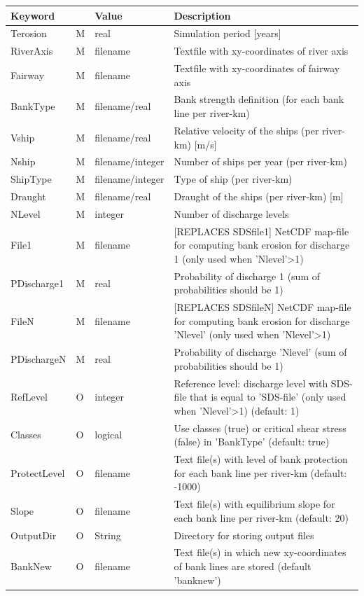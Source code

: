\begin{tabular}{lllp{5cm}}
Keyword &  & Value & Description \\ \hline
Terosion & M & real & Simulation period  [years] \\
RiverAxis & M & filename & Textfile with xy-coordinates of river axis \\
Fairway  & M & filename & Textfile with xy-coordinates of fairway axis \\
BankType & M & filename/real & Bank strength definition (for each bank line per river-km) \\
Vship  & M & filename/real & Relative velocity of the ships (per river-km) [m/s] \\
Nship  & M & filename/integer & Number of ships per year (per river-km) \\
ShipType & M & filename/integer & Type of ship (per river-km) \\
Draught & M & filename/real & Draught of the ships (per river-km) [m] \\
NLevel & M & integer & Number of discharge levels \\
File1 & M & filename & [REPLACES SDSfile1] NetCDF map-file for computing bank erosion for discharge 1 (only used when 'Nlevel'>1) \\
PDischarge1 & M & real & Probability of discharge 1 (sum of probabilities should be 1) \\
FileN & M & filename & [REPLACES SDSfileN] NetCDF map-file for computing bank erosion for discharge 'Nlevel' (only used when 'Nlevel'>1) \\
PDischargeN & M & real & Probability of discharge 'Nlevel' (sum of probabilities should be 1) \\
RefLevel & O & integer & Reference level: discharge level with SDS-file that is equal to 'SDS-file' (only used when 'Nlevel'>1)  (default: 1) \\
Classes & O & logical & Use classes (true) or critical shear stress (false) in 'BankType' (default: true) \\
ProtectLevel & O & filename & Text file(s) with level of bank protection for each bank line per river-km (default: -1000) \\
Slope & O & filename & Text file(s) with equilibrium slope for each bank line per river-km  (default: 20) \\
OutputDir & O & String & Directory for storing output files \\
BankNew & O & filename & Text file(s) in which new xy-coordinates of bank lines are stored (default 'banknew') \\

\end{tabular}
